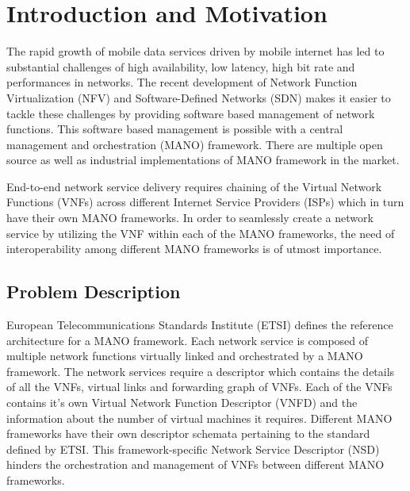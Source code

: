 \newcommand{\comment}[1]{}
\chapter{Introduction and Motivation}
\label{ch:Motivation}
\comment{
The rapid growth of mobile data services driven by mobile internet has led to substantial challenges of high availability, low latency, high bit rate and performances in networks. The recent development of Network Function Virtualization (NFV) and Software-Defined Networks (SDN) have emerged as key enablers for 5G networks. 
There has been a paradigm shift in networking with the recent developments in network virtualization technology. NFV involves decoupling of the hardware components from the software components of a network function. NFV requires a central management and orchestrations (MANO) framework in order to fully deliver end-to-end services of an application. There are multiple open source as well as industrial implementations of MANO framework in the market. }

The rapid growth of mobile data services driven by mobile internet has led to substantial challenges of high availability, low latency, high bit rate and performances in networks. The recent development of Network Function Virtualization (NFV) and Software-Defined Networks (SDN) makes it easier to tackle these challenges by providing software based management of network functions. This software based management is possible with a central management and orchestration (MANO) framework. There are multiple open source as well as industrial implementations of MANO framework in the market.

End-to-end network service delivery requires chaining of the Virtual Network Functions (VNFs) across different Internet Service Providers (ISPs) which in turn have their own MANO frameworks. In order to seamlessly create a network service by utilizing the VNF within each of the MANO frameworks, the need of interoperability among different MANO frameworks is of utmost importance.


\section{Problem Description}

European Telecommunications Standards Institute (ETSI) defines the reference architecture for a MANO framework. Each network service is composed of multiple network functions virtually linked and orchestrated by a MANO framework. The network services require a descriptor which contains the details of all the VNFs, virtual links and forwarding graph of VNFs. Each of the VNFs contains it's own Virtual Network Function Descriptor (VNFD) and the information about the number of virtual machines it requires. Different MANO frameworks have their own descriptor schemata pertaining to the standard defined by ETSI. This framework-specific Network Service Descriptor (NSD) hinders the orchestration and management of VNFs between different MANO frameworks. 

